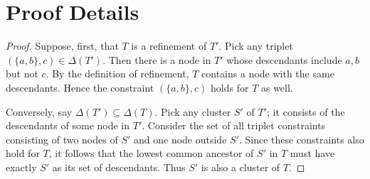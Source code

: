 \section{Proof Details}
\label{sec:ibhc-proof}

\treerefinement*
\begin{proof}
Suppose, first, that $T$ is a refinement of $T'$. Pick any triplet $(\{a,b\},c) \in \Delta(T')$. Then there is a node in $T'$ whose descendants include $a,b$ but not $c$. By the definition of refinement, $T$ contains a node with the same descendants. Hence the constraint $(\{a,b\},c)$ holds for $T$ as well.

Conversely, say $\Delta(T') \subseteq \Delta(T)$. Pick any cluster $S'$ of $T'$; it consists of the descendants of some node in $T'$. Consider the set of all triplet constraints consisting of two nodes of $S'$ and one node outside $S'$. Since these constraints also hold for $T$, it follows that the lowest common ancestor of $S'$ in $T$ must have exactly $S'$ as its set of descendants. Thus $S'$ is also a cluster of $T$.
\end{proof}

